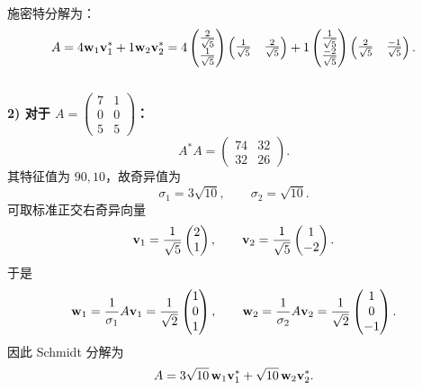 \begin{exer}
\\
施密特分解为：
$$ A = 4 \mathbf{w}_1 \mathbf{v}_1^* + 1 \mathbf{w}_2 \mathbf{v}_2^* = 4 \begin{pmatrix} \frac{2}{\sqrt{5}} \\ \frac{1}{\sqrt{5}} \end{pmatrix} \begin{pmatrix} \frac{1}{\sqrt{5}} & \frac{2}{\sqrt{5}} \end{pmatrix} + 1 \begin{pmatrix} \frac{1}{\sqrt{5}} \\ \frac{-2}{\sqrt{5}} \end{pmatrix} \begin{pmatrix} \frac{2}{\sqrt{5}} & \frac{-1}{\sqrt{5}} \end{pmatrix}. $$
\\
\textbf{2) 对于 $A=\begin{pmatrix}7&1\\0&0\\5&5\end{pmatrix}$：}
$$A^*A=\begin{pmatrix}74&32\\32&26\end{pmatrix}.$$
其特征值为 $90,10$，故奇异值为
$$\sigma_1=3\sqrt{10},\qquad \sigma_2=\sqrt{10}.$$
可取标准正交右奇异向量
$$\mathbf{v}_1=\frac1{\sqrt5}\begin{pmatrix}2\\1\end{pmatrix},\qquad
\mathbf{v}_2=\frac1{\sqrt5}\begin{pmatrix}1\\-2\end{pmatrix}.$$
于是
$$\mathbf{w}_1=\frac1{\sigma_1}A\mathbf{v}_1=\frac1{\sqrt2}\begin{pmatrix}1\\0\\1\end{pmatrix},\qquad
\mathbf{w}_2=\frac1{\sigma_2}A\mathbf{v}_2=\frac1{\sqrt2}\begin{pmatrix}1\\0\\-1\end{pmatrix}.$$
因此 Schmidt 分解为
$$A=3\sqrt{10}\,\mathbf{w}_1\mathbf{v}_1^*+\sqrt{10}\,\mathbf{w}_2\mathbf{v}_2^*.$$


\end{exer}
